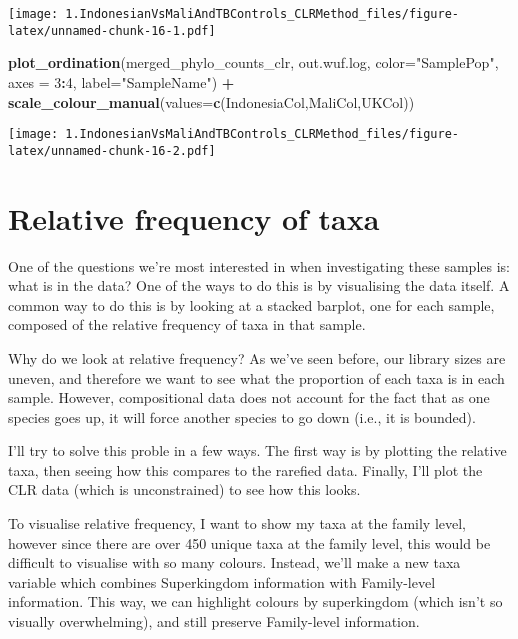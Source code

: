 \documentclass[]{article}
\newenvironment{Shaded}{\begin{snugshade}}{\end{snugshade}}
\newcommand{\DataTypeTok}[1]{\textcolor[rgb]{0.13,0.29,0.53}{#1}}
\newcommand{\DecValTok}[1]{\textcolor[rgb]{0.00,0.00,0.81}{#1}}
\newcommand{\KeywordTok}[1]{\textcolor[rgb]{0.13,0.29,0.53}{\textbf{#1}}}
\newcommand{\NormalTok}[1]{#1}
\newcommand{\OperatorTok}[1]{\textcolor[rgb]{0.81,0.36,0.00}{\textbf{#1}}}
\newcommand{\StringTok}[1]{\textcolor[rgb]{0.31,0.60,0.02}{#1}}
\begin{document}
\texttt{[image: 1.IndonesianVsMaliAndTBControls\_CLRMethod\_files/figure-latex/unnamed-chunk-16-1.pdf]}

\begin{Shaded}
\begin{Highlighting}[]
\KeywordTok{plot_ordination}\NormalTok{(merged_phylo_counts_clr, out.wuf.log, }\DataTypeTok{color=}\StringTok{"SamplePop"}\NormalTok{, }\DataTypeTok{axes =} \DecValTok{3}\OperatorTok{:}\DecValTok{4}\NormalTok{, }\DataTypeTok{label=}\StringTok{"SampleName"}\NormalTok{) }\OperatorTok{+}\StringTok{ }\KeywordTok{scale_colour_manual}\NormalTok{(}\DataTypeTok{values=}\KeywordTok{c}\NormalTok{(IndonesiaCol,MaliCol,UKCol))}
\end{Highlighting}
\end{Shaded}

\texttt{[image: 1.IndonesianVsMaliAndTBControls\_CLRMethod\_files/figure-latex/unnamed-chunk-16-2.pdf]}

\hypertarget{relative-frequency-of-taxa}{%
\section{Relative frequency of taxa}\label{relative-frequency-of-taxa}}

One of the questions we're most interested in when investigating these
samples is: what is in the data? One of the ways to do this is by
visualising the data itself. A common way to do this is by looking at a
stacked barplot, one for each sample, composed of the relative frequency
of taxa in that sample.

Why do we look at relative frequency? As we've seen before, our library
sizes are uneven, and therefore we want to see what the proportion of
each taxa is in each sample. However, compositional data does not
account for the fact that as one species goes up, it will force another
species to go down (i.e., it is bounded).

I'll try to solve this proble in a few ways. The first way is by
plotting the relative taxa, then seeing how this compares to the
rarefied data. Finally, I'll plot the CLR data (which is unconstrained)
to see how this looks.

To visualise relative frequency, I want to show my taxa at the family
level, however since there are over 450 unique taxa at the family level,
this would be difficult to visualise with so many colours. Instead,
we'll make a new taxa variable which combines Superkingdom information
with Family-level information. This way, we can highlight colours by
superkingdom (which isn't so visually overwhelming), and still preserve
Family-level information.
\end{document}
